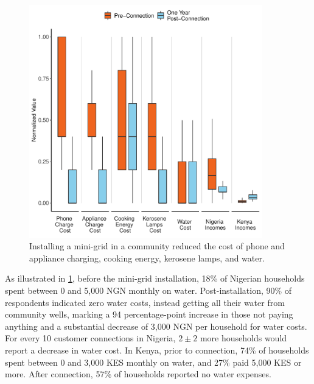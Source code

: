 \begin{figure}[t]
    \centering
    \includegraphics[width=0.9\textwidth]{images/economic_activity_paired_results.pdf}
    \caption{Installing a mini-grid in a community reduced the cost of phone and appliance charging, cooking energy, kerosene lamps, and water.}
    \label{fig:economic_paired_results}
\end{figure}

As illustrated in \cref{fig:economic_paired_results}, before the mini-grid installation, 18\% of Nigerian households spent between 0 and 5,000 NGN monthly on water. Post-installation, 90\% of respondents indicated zero water costs, instead getting all their water from community wells, marking a 94 percentage-point increase in those not paying anything and a substantial decrease of 3,000 NGN per household for water costs. For every 10 customer connections in Nigeria, $2\pm2$ more households would report a decrease in water cost. In Kenya, prior to connection, 74\% of households spent between 0 and 3,000 KES monthly on water, and 27\% paid 5,000 KES or more. After connection, 57\% of households reported no water expenses.

